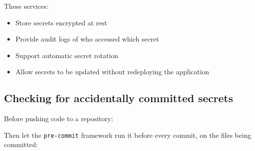 \noindent{}These services:

\begin{itemize}
\tightlist
\item
  Store secrets encrypted at rest
\item
  Provide audit logs of who accessed which secret
\item
  Support automatic secret rotation
\item
  Allow secrets to be updated without redeploying the application
\end{itemize}

\subsection*{Checking for accidentally committed secrets}\label{38-security:checking-for-accidentally-committed-secrets}

Before pushing code to a repository:

\begin{codebox}[short]

\begin{Shaded}
\begin{Highlighting}[]

\OperatorTok{\textgreater{}}
\end{Highlighting}
\end{Shaded}

\end{codebox}

\noindent{}Then let the \texttt{pre-commit} framework run it before every commit, on the files being committed:

\begin{codebox}[short]

\begin{Shaded}
\begin{Highlighting}[]
\KeywordTok{:}
\AttributeTok{  }\KeywordTok{{-}}\AttributeTok{ }\KeywordTok{:}
\AttributeTok{    }\KeywordTok{:}
\AttributeTok{    }\KeywordTok{:}
\AttributeTok{      }\KeywordTok{{-}}\AttributeTok{ }\KeywordTok{:}
\AttributeTok{        }\KeywordTok{:}\AttributeTok{ }\KeywordTok{[}\KeywordTok{,}\AttributeTok{ }\KeywordTok{]}
\end{Highlighting}
\end{Shaded}

\end{codebox}

